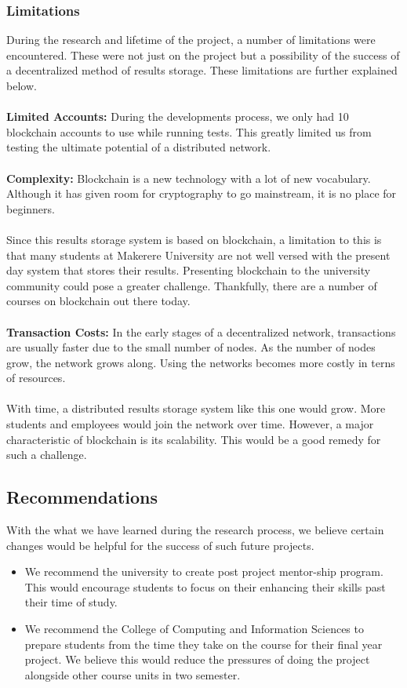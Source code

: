 \subsubsection{Limitations}
During the research and lifetime of the project, a number of limitations were encountered. These were not just on the project but a possibility of the success of a decentralized method of results storage. These limitations are further explained below.\\\\
\textbf{Limited Accounts: }During the developments process, we only had 10 blockchain accounts to use while running tests. This greatly limited us from testing the ultimate potential of a distributed network.\\\\
\textbf{Complexity:} Blockchain is a new technology with a lot of new vocabulary. Although it has given room for cryptography to go mainstream, it is no place for beginners.\\\\
Since this results storage system is based on blockchain, a limitation to this is that many students at Makerere University are not well versed with the present day system that stores their results. Presenting blockchain to the university community could pose a greater challenge. Thankfully, there are a number of courses on blockchain out there today. \\\\
\textbf{Transaction Costs: }In the early stages of a decentralized network, transactions are usually faster due to the small number of nodes. As the number of nodes grow, the network grows along. Using the networks becomes more costly in terns of resources.\\\\
With time, a distributed results storage system like this one would grow. More students and employees would join the network over time. However, a major characteristic of blockchain is its scalability. This would be a good remedy for such a challenge.

\subsection{Recommendations}
With the what we have learned during the research process, we believe certain changes would be helpful for the success of such future projects.
\begin{itemize}
\item We recommend the university to create post project mentor-ship program. This would encourage students to focus on their enhancing their skills past their time of study.
\item We recommend the College of Computing and Information Sciences to prepare students from the time they take on the course for their final year project. We believe this would reduce the pressures of doing the project alongside other course units in two semester. 
\end{itemize}

